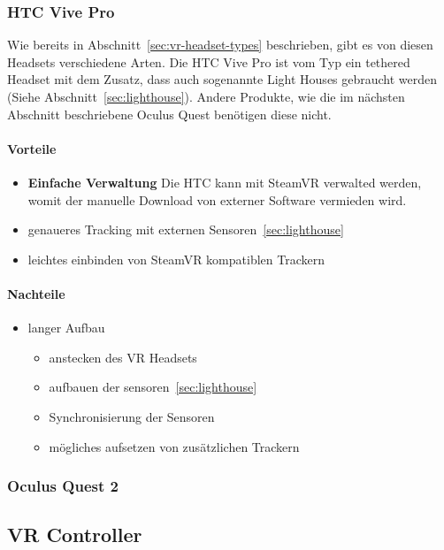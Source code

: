 \subsubsection{HTC Vive Pro}

Wie bereits in Abschnitt~\ref{sec:vr-headset-types} beschrieben, gibt es von diesen Headsets verschiedene Arten.
Die HTC Vive Pro ist vom Typ ein tethered Headset mit dem Zusatz, dass auch sogenannte Light Houses gebraucht werden (Siehe Abschnitt~\ref{sec:lighthouse}).
Andere Produkte, wie die im nächsten Abschnitt beschriebene Oculus Quest benötigen diese nicht.

\paragraph{Vorteile}

\begin{itemize}
    \item {\bf Einfache Verwaltung} Die HTC kann mit SteamVR verwalted werden, womit der manuelle Download von externer Software vermieden wird.
    \item genaueres Tracking mit externen Sensoren~\ref{sec:lighthouse}
    \item leichtes einbinden von SteamVR kompatiblen Trackern
\end{itemize}

\paragraph{Nachteile}

\begin{itemize}
    \item langer Aufbau
    \begin{itemize}
        \item anstecken des VR Headsets
        \item aufbauen der sensoren~\ref{sec:lighthouse}
        \item Synchronisierung der Sensoren
        \item mögliches aufsetzen von zusätzlichen Trackern
    \end{itemize}
\end{itemize}


\subsubsection{Oculus Quest 2}\label{sec:oculus-quest-2}

\subsection{VR Controller}\label{sec:vr-controller}

